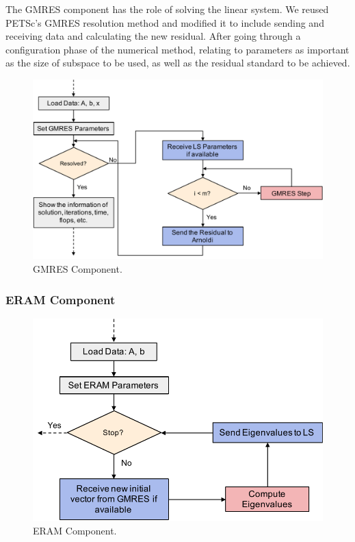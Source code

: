 The GMRES component has the role of solving the linear system.  We reused PETSc's GMRES resolution method and modified it to include sending and receiving data and calculating the new residual. After going through a configuration phase of the numerical method, relating to parameters as important as the size of subspace to be used, as well as the residual standard to be achieved.

\begin{figure}[htbp]
	\centering
	\includegraphics[width=6.2in]{fig/GMRES-component.pdf}
	\caption{GMRES Component.}
	\label{gmres-component}
\end{figure}

\subsubsection{ERAM Component}

\begin{figure}[htbp]
	\centering
	\includegraphics[width=4.8in]{fig/ERAM-component.pdf}
	\caption{ERAM Component.}
	\label{eram-component}
\end{figure}

